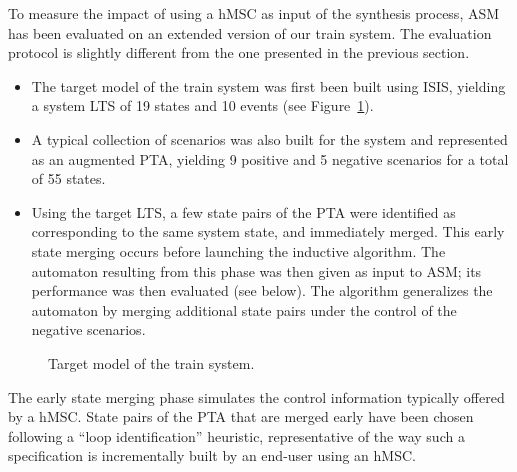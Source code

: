 To measure the impact of using a hMSC as input of the synthesis process, ASM has been evaluated on an extended version of our train system. The evaluation protocol is slightly different from the one presented in the previous section.
\begin{itemize}
\item The target model of the train system was first been built using ISIS, yielding a system LTS of 19 states and 10 events (see Figure~\ref{image:case-studies-big-train-2}). 
\item A typical collection of scenarios was also built for the system and represented as an augmented PTA, yielding 9 positive and 5 negative scenarios for a total of 55 states.
\item Using the target LTS, a few state pairs of the PTA were identified as corresponding to the same system state, and immediately merged. This early state merging occurs before launching the inductive algorithm. The automaton resulting from this phase was then given as input to ASM; its performance was then evaluated (see below). The algorithm generalizes the automaton by merging additional state pairs under the control of the negative scenarios.
\end{itemize}

\begin{figure}
\centering
{}
\caption{Target model of the train system.\label{image:case-studies-big-train-2}}
\end{figure}

The early state merging phase simulates the control information typically offered by a hMSC. State pairs of the PTA that are merged early have been chosen following a ``loop identification'' heuristic, representative of the way such a specification is incrementally built by an end-user using an hMSC. 

